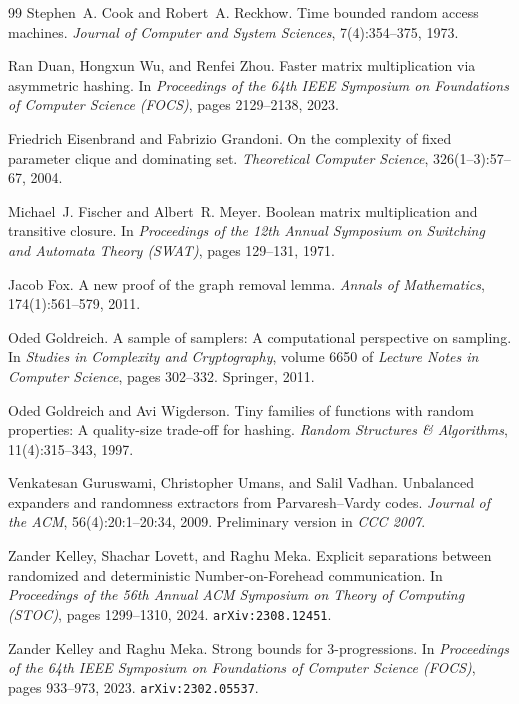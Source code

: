 \documentclass[11pt]{article}
\theoremstyle{definition}
\begin{document}
\begin{thebibliography}{99}
Stephen~A. Cook and Robert~A. Reckhow.
\newblock Time bounded random access machines.
\newblock \emph{Journal of Computer and System Sciences}, 7(4):354--375, 1973.

Ran Duan, Hongxun Wu, and Renfei Zhou.
\newblock Faster matrix multiplication via asymmetric hashing.
\newblock In \emph{Proceedings of the 64th IEEE Symposium on Foundations of Computer Science (FOCS)}, pages 2129--2138, 2023.

Friedrich Eisenbrand and Fabrizio Grandoni.
\newblock On the complexity of fixed parameter clique and dominating set.
\newblock \emph{Theoretical Computer Science}, 326(1--3):57--67, 2004.

Michael~J. Fischer and Albert~R. Meyer.
\newblock Boolean matrix multiplication and transitive closure.
\newblock In \emph{Proceedings of the 12th Annual Symposium on Switching and Automata Theory (SWAT)}, pages 129--131, 1971.

Jacob Fox.
\newblock A new proof of the graph removal lemma.
\newblock \emph{Annals of Mathematics}, 174(1):561--579, 2011.

Oded Goldreich.
\newblock A sample of samplers: A computational perspective on sampling.
\newblock In \emph{Studies in Complexity and Cryptography}, volume 6650 of \emph{Lecture Notes in Computer Science}, pages 302--332. Springer, 2011.

Oded Goldreich and Avi Wigderson.
\newblock Tiny families of functions with random properties: A quality-size trade-off for hashing.
\newblock \emph{Random Structures \& Algorithms}, 11(4):315--343, 1997.

Venkatesan Guruswami, Christopher Umans, and Salil Vadhan.
\newblock Unbalanced expanders and randomness extractors from Parvaresh--Vardy codes.
\newblock \emph{Journal of the ACM}, 56(4):20:1--20:34, 2009.
\newblock Preliminary version in \emph{CCC 2007}.

Zander Kelley, Shachar Lovett, and Raghu Meka.
\newblock Explicit separations between randomized and deterministic Number-on-Forehead communication.
\newblock In \emph{Proceedings of the 56th Annual ACM Symposium on Theory of Computing (STOC)}, pages 1299--1310, 2024.
\newblock \texttt{arXiv:2308.12451}.

Zander Kelley and Raghu Meka.
\newblock Strong bounds for 3-progressions.
\newblock In \emph{Proceedings of the 64th IEEE Symposium on Foundations of Computer Science (FOCS)}, pages 933--973, 2023.
\newblock \texttt{arXiv:2302.05537}.


\end{thebibliography}
\end{document}
